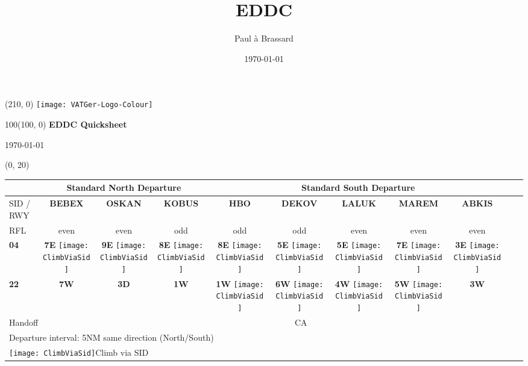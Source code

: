 \documentclass[10pt,landscape,a4paper]{article}
\title{EDDC}
\author{Paul à Brassard}
\date{\today}
\newcommand{\x}{\texttt{[image: ClimbViaSid]}}
\begin{document}
\setlength\extrarowheight{1pt}

\setlength{\TPHorizModule}{1mm}
\setlength{\TPVertModule}{\TPHorizModule}
\textblockorigin{7mm}{12mm}

\begin{textblock}{2}(210, 0)
  \texttt{[image: VATGer-Logo-Colour]}
\end{textblock}


\begin{textblock}{100}(100, 0)
  \large
  \centering
  \textbf{EDDC Quicksheet}

  \today
\end{textblock}


\begin{textblock}{30}(0, 20)
\begin{table}
\begin{tabular}{|l|c|c|c||c|c|c|c|c|c|l|}
\multicolumn{1}{l}{} & \multicolumn{3}{c}{\textbf{Standard North Departure}} & \multicolumn{5}{c}{\textbf{Standard South Departure}}    \\ \hline
SID / RWY 	& \textbf{BEBEX} & \textbf{OSKAN} & \textbf{KOBUS} & \textbf{HBO} & \textbf{DEKOV} & \textbf{LALUK} & \textbf{MAREM} & \textbf{ABKIS} & \multirow{5}{*}{\rotatebox{90}{\textbf{FL70}}} \\
RFL 		& even & even & odd & odd & odd & even & even & even & \\ \cline{0-8}
\textbf{04}	& \textbf{7E} \x & \textbf{9E} \x & \textbf{8E} \x & \textbf{8E} \x & \textbf{5E} \x & \textbf{5E} \x & \textbf{7E} \x & \textbf{3E} \x & \\ \cline{0-8}
\textbf{22}	& \textbf{7W} & \textbf{3D} & \textbf{1W} & \textbf{1W} \x & \textbf{6W} \x & \textbf{4W} \x & \textbf{5W} \x & \textbf{3W} & \\ \hline

\multicolumn{2}{|l}{Handoff} & \multicolumn{7}{c|}{CA} \\ \cline{0-8}
\multicolumn{8}{l}{Departure interval: 5NM same direction (North/South)} \\
\multicolumn{8}{l}{\x \color{red}Climb via SID} \\
\end{tabular}
\end{table}
\end{textblock}
\end{document}
